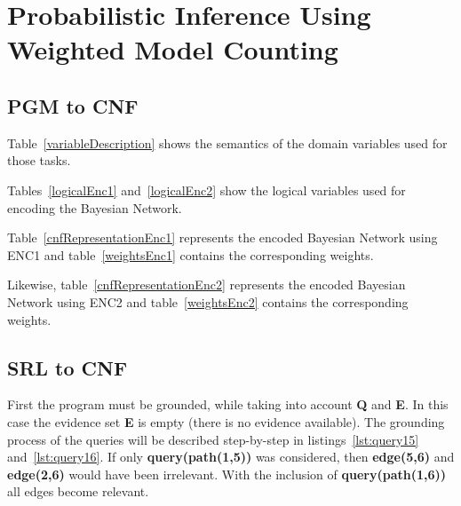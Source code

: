 \section{Probabilistic Inference Using Weighted Model Counting}
\subsection{PGM to CNF}

Table~\ref{variableDescription} shows the semantics of the domain variables used for those tasks.

Tables~\ref{logicalEnc1} and~\ref{logicalEnc2} show the logical variables used for encoding the Bayesian Network.

Table~\ref{cnfRepresentationEnc1} represents the encoded Bayesian Network using ENC1 and table~\ref{weightsEnc1} contains the corresponding weights.

Likewise, table~\ref{cnfRepresentationEnc2} represents the encoded Bayesian Network using ENC2 and table~\ref{weightsEnc2} contains the corresponding weights.













\subsection{SRL to CNF}

First the program must be grounded, while taking into account \textbf{Q} and \textbf{E}. In this case the evidence set \textbf{E} is empty (there is no evidence available). The grounding process of the queries will be described step-by-step in listings~\ref{lst:query15} and~\ref{lst:query16}.  If only \textbf{query(path(1,5))} was considered, then \textbf{edge(5,6)} and \textbf{edge(2,6)} would have been irrelevant. With the inclusion of \textbf{query(path(1,6))} all edges become relevant.



